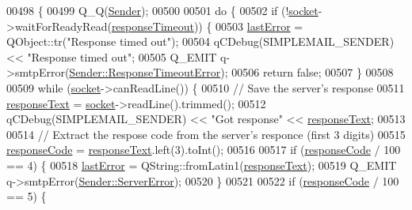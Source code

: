 \begin{DoxyCode}
00498 \{
00499     Q\_Q(\hyperlink{class_simple_mail_1_1_sender}{Sender});
00500 
00501     \textcolor{keywordflow}{do} \{
00502         \textcolor{keywordflow}{if} (!\hyperlink{class_simple_mail_1_1_sender_private_a223cab47555a39f45f30569328fa20bc}{socket}->waitForReadyRead(\hyperlink{class_simple_mail_1_1_sender_private_a970745d144eb65e5fa2dae5677b98438}{responseTimeout})) \{
00503             \hyperlink{class_simple_mail_1_1_sender_private_a90ae4ff740007836307ede01aad3a277}{lastError} = QObject::tr(\textcolor{stringliteral}{"Response timed out"});
00504             qCDebug(SIMPLEMAIL\_SENDER) << \textcolor{stringliteral}{"Response timed out"};
00505             Q\_EMIT q->smtpError(\hyperlink{class_simple_mail_1_1_sender_a276560e9e955ab6be451338c3776bf49ab7330dcb7ea2b4435124d62245cbe052}{Sender::ResponseTimeoutError});
00506             \textcolor{keywordflow}{return} \textcolor{keyword}{false};
00507         \}
00508 
00509         \textcolor{keywordflow}{while} (\hyperlink{class_simple_mail_1_1_sender_private_a223cab47555a39f45f30569328fa20bc}{socket}->canReadLine()) \{
00510             \textcolor{comment}{// Save the server's response}
00511             \hyperlink{class_simple_mail_1_1_sender_private_ad355d66dfce2628cb0e7e83a5f65d27e}{responseText} = \hyperlink{class_simple_mail_1_1_sender_private_a223cab47555a39f45f30569328fa20bc}{socket}->readLine().trimmed();
00512             qCDebug(SIMPLEMAIL\_SENDER) << \textcolor{stringliteral}{"Got response"} << \hyperlink{class_simple_mail_1_1_sender_private_ad355d66dfce2628cb0e7e83a5f65d27e}{responseText};
00513 
00514             \textcolor{comment}{// Extract the respose code from the server's responce (first 3 digits)}
00515             \hyperlink{class_simple_mail_1_1_sender_private_ac612465360ce40cfa71310f5f7353b3d}{responseCode} = \hyperlink{class_simple_mail_1_1_sender_private_ad355d66dfce2628cb0e7e83a5f65d27e}{responseText}.left(3).toInt();
00516 
00517             \textcolor{keywordflow}{if} (\hyperlink{class_simple_mail_1_1_sender_private_ac612465360ce40cfa71310f5f7353b3d}{responseCode} / 100 == 4) \{
00518                 \hyperlink{class_simple_mail_1_1_sender_private_a90ae4ff740007836307ede01aad3a277}{lastError} = QString::fromLatin1(\hyperlink{class_simple_mail_1_1_sender_private_ad355d66dfce2628cb0e7e83a5f65d27e}{responseText});
00519                 Q\_EMIT q->smtpError(\hyperlink{class_simple_mail_1_1_sender_a276560e9e955ab6be451338c3776bf49aa5d58da2b004bb7275a92029fe432089}{Sender::ServerError});
00520             \}
00521 
00522             \textcolor{keywordflow}{if} (\hyperlink{class_simple_mail_1_1_sender_private_ac612465360ce40cfa71310f5f7353b3d}{responseCode} / 100 == 5) \{

\end{DoxyCode}
